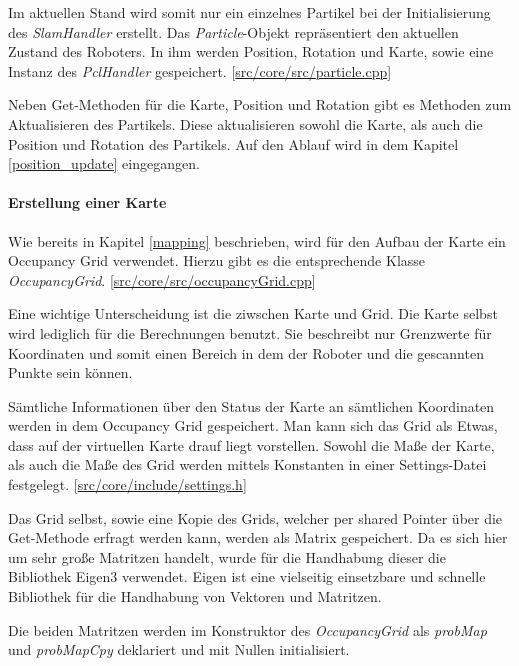 Im aktuellen Stand wird somit nur ein einzelnes Partikel bei der Initialisierung des \textit{SlamHandler} erstellt.
Das \textit{Particle}-Objekt repräsentiert den aktuellen Zustand des Roboters.
In ihm werden Position, Rotation und Karte, sowie eine Instanz des \textit{PclHandler} gespeichert.
[\href{https://github.com/Jundy0/Studienarbeit/blob/main/src/core/src/particle.cpp}{src/core/src/particle.cpp}]

Neben Get-Methoden für die Karte, Position und Rotation gibt es Methoden zum Aktualisieren des Partikels.
Diese aktualisieren sowohl die Karte, als auch die Position und Rotation des Partikels.
Auf den Ablauf wird in dem Kapitel \ref{position_update} eingegangen.

\paragraph{Erstellung einer Karte}
Wie bereits in Kapitel \ref{mapping} beschrieben, wird für den Aufbau der Karte ein Occupancy Grid verwendet.
Hierzu gibt es die entsprechende Klasse \textit{OccupancyGrid}.
[\href{https://github.com/Jundy0/Studienarbeit/blob/main/src/core/src/occupancyGrid.cpp}{src/core/src/occupancyGrid.cpp}]

Eine wichtige Unterscheidung ist die ziwschen Karte und Grid.
Die Karte selbst wird lediglich für die Berechnungen benutzt.
Sie beschreibt nur Grenzwerte für Koordinaten und somit einen Bereich in dem der Roboter und die gescannten Punkte sein können.

Sämtliche Informationen über den Status der Karte an sämtlichen Koordinaten werden in dem Occupancy Grid gespeichert.
Man kann sich das Grid als Etwas, dass auf der virtuellen Karte drauf liegt vorstellen.
Sowohl die Maße der Karte, als auch die Maße des Grid werden mittels Konstanten in einer Settings-Datei festgelegt.
[\href{https://github.com/Jundy0/Studienarbeit/blob/main/src/core/include/settings.h}{src/core/include/settings.h}]

Das Grid selbst, sowie eine Kopie des Grids, welcher per shared Pointer über die Get-Methode erfragt werden kann, werden als Matrix gespeichert.
Da es sich hier um sehr große Matritzen handelt, wurde für die Handhabung dieser die Bibliothek Eigen3 verwendet.
Eigen ist eine vielseitig einsetzbare und schnelle Bibliothek für die Handhabung von Vektoren und Matritzen.

Die beiden Matritzen werden im Konstruktor des \textit{OccupancyGrid} als \textit{probMap} und \textit{probMapCpy} deklariert und mit Nullen initialisiert.
\newline

